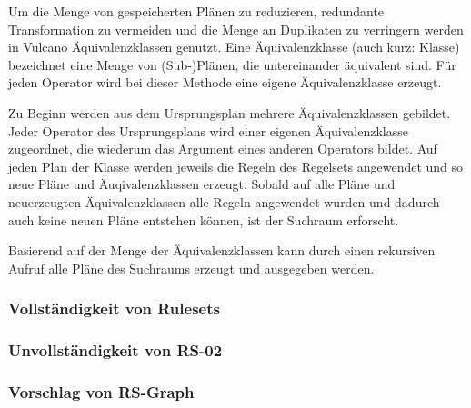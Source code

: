 Um die Menge von gespeicherten Plänen zu reduzieren, redundante Transformation zu vermeiden und die Menge an Duplikaten zu verringern werden in Vulcano Äquivalenzklassen genutzt. Eine Äquivalenzklasse (auch kurz: Klasse) bezeichnet eine Menge von (Sub-)Plänen, die untereinander äquivalent sind. Für jeden Operator wird bei dieser Methode eine eigene Äquivalenzklasse erzeugt.

Zu Beginn werden aus dem Ursprungsplan mehrere Äquivalenzklassen gebildet. Jeder Operator des Ursprungsplans wird einer eigenen Äquivalenzklasse zugeordnet, die wiederum das Argument eines anderen Operators bildet. Auf jeden Plan der Klasse werden jeweils die Regeln des Regelsets angewendet und so neue Pläne und Äuqivalenzklassen erzeugt. Sobald auf alle Pläne und neuerzeugten Äquivalenzklassen alle Regeln angewendet wurden und dadurch auch keine neuen Pläne entstehen können, ist der Suchraum erforscht.

Basierend auf der Menge der Äquivalenzklassen kann durch einen rekursiven Aufruf alle Pläne des Suchraums erzeugt und ausgegeben werden.


\subsubsection{Vollständigkeit von Rulesets}

\cite{shanbhag2014optimizing}

\subsubsection{Unvollständigkeit von RS-02}

\subsubsection{Vorschlag von RS-Graph}

\cite{shanbhag2014optimizing}
